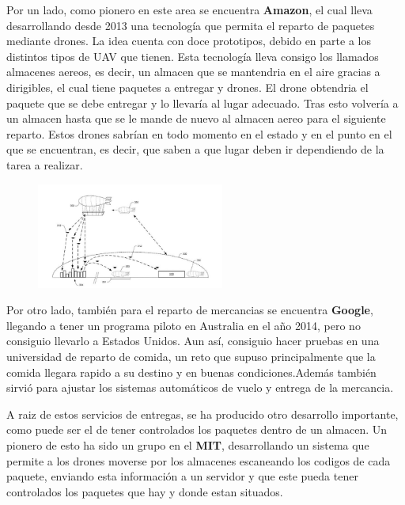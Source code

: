 \hspace{1 cm} Por un lado, como pionero en este area se encuentra \textbf{Amazon}, el cual lleva desarrollando desde 2013 una tecnolog\'ia que permita el reparto de paquetes mediante drones. La idea cuenta con doce prototipos, debido en parte a los distintos tipos de UAV que tienen.  Esta tecnolog\'ia lleva consigo los llamados almacenes aereos, es decir, un almacen que se mantendria en el aire gracias a dirigibles, el cual tiene paquetes a entregar y drones. El drone obtendria el paquete que se debe entregar y lo llevar\'ia al lugar adecuado. Tras esto volver\'ia a un almacen hasta que se le mande de nuevo al almacen aereo para el siguiente reparto. Estos drones sabr\'ian en todo momento en el estado y en el punto en el que se encuentran, es decir, que saben a que lugar deben ir dependiendo de la tarea a realizar. 

\begin{figure}[ht]
	\centering
		\includegraphics[width=0.55\textwidth]{imgs/amazon.jpg}
	\label{fig:Esquema de reparto con drones}
\end{figure}

\hspace{1 cm} Por otro lado, tambi\'en para el reparto de mercancias se encuentra \textbf{Google}, llegando a tener un programa piloto en Australia en el año 2014, pero no consiguio llevarlo a Estados Unidos. Aun as\'i, consiguio hacer pruebas en una universidad de reparto de comida, un reto que supuso principalmente que la comida llegara rapido a su destino y en buenas condiciones.Adem\'as tambi\'en sirvi\'o para ajustar los sistemas autom\'aticos de vuelo y entrega de la mercancia. 

\hspace{1 cm} A raiz de estos servicios de entregas, se ha producido otro desarrollo importante, como puede ser el de tener controlados los paquetes dentro de un almacen. Un pionero de esto ha sido un grupo en el \textbf{MIT}, desarrollando un sistema que permite a los drones moverse por los almacenes escaneando los codigos de cada paquete, enviando esta informaci\'on a un servidor y que este pueda tener controlados los paquetes que hay y donde estan situados. 


